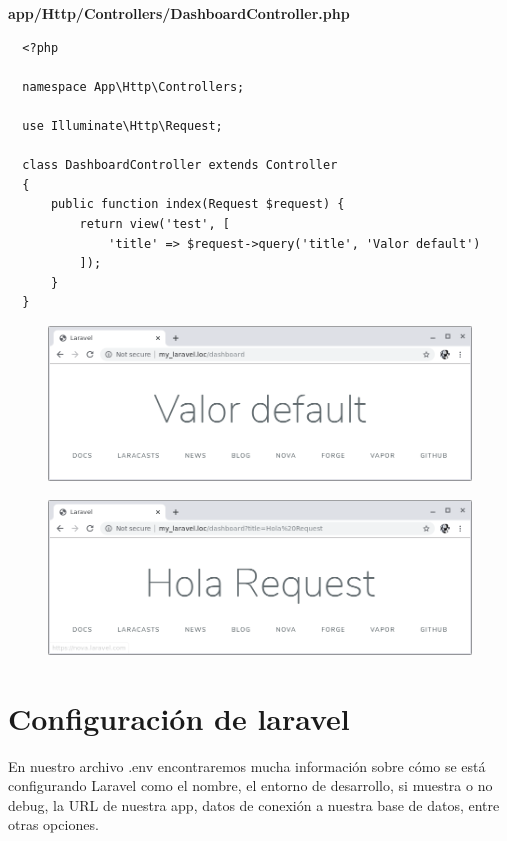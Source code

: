 \documentclass{article}
\begin{document}
\textbf{app/Http/Controllers/DashboardController.php}
\begin{verbatim}
  <?php

  namespace App\Http\Controllers;

  use Illuminate\Http\Request;

  class DashboardController extends Controller
  {
      public function index(Request $request) {
          return view('test', [
              'title' => $request->query('title', 'Valor default')
          ]);
      }
  }
\end{verbatim}

\begin{figure}[h!]
  \centering
  \includegraphics[scale=0.5]{./Pictures/020_title_default.png}
\end{figure}

\begin{figure}[h!]
  \centering
  \includegraphics[scale=0.5]{./Pictures/021_title_hola_request.png}
\end{figure}



\section{Configuración de laravel}%
En nuestro archivo .env encontraremos mucha información sobre cómo se está
configurando Laravel como el nombre, el entorno de desarrollo, si muestra o no
debug, la URL de nuestra app, datos de conexión a nuestra base de datos, entre
otras opciones.\\
\end{document}
